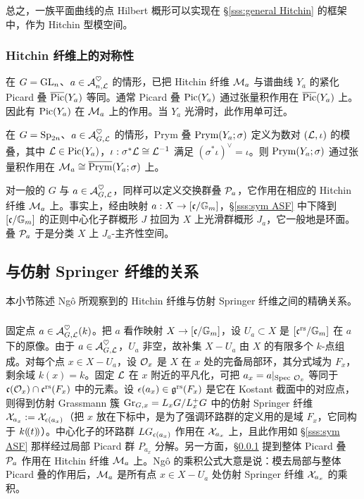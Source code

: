 总之，一族平面曲线的点 Hilbert 概形可以实现在 \S\ref{sss:general Hitchin} 的框架中，作为 Hitchin 型模空间。

\subsubsection{Hitchin 纤维上的对称性}\label{sss:sym Hit}
在 $G=\textup{GL}_{n}$、$a\in\mathcal{A}^{\heartsuit}_{n,\mathcal{L}}$ 的情形，已把 Hitchin 纤维 $\mathcal{M}_{a}$ 与谱曲线 $Y_{a}$ 的紧化 Picard 叠 $\overline{\textup{Pic}}(Y_{a})$ 等同。通常 Picard 叠 $\textup{Pic}(Y_{a})$ 通过张量积作用在 $\overline{\textup{Pic}}(Y_{a})$ 上。因此有 $\textup{Pic}(Y_{a})$ 在 $\mathcal{M}_{a}$ 上的作用。当 $Y_{a}$ 光滑时，此作用单可迁。

在 $G=\textup{Sp}_{2n}$、$a\in\mathcal{A}^{\heartsuit}_{G,\mathcal{L}}$ 的情形，Prym 叠 $\textup{Prym}(Y_{a};\sigma)$ 定义为数对 $(\mathcal{L},\iota)$ 的模叠，其中 $\mathcal{L}\in\textup{Pic}(Y_{a})$，$\iota:\sigma^*\mathcal{L}\cong\mathcal{L}^{-1}$ 满足 $(\sigma^{*}\iota)^{\vee}=\iota$。则 $\textup{Prym}(Y_{a};\sigma)$ 通过张量积作用在 $\mathcal{M}_{a}\cong\overline{\textup{Prym}}(Y_{a};\sigma)$ 上。

对一般的 $G$ 与 $a\in\mathcal{A}^{\heartsuit}_{G,\mathcal{L}}$，同样可以定义交换群叠 $\mathcal{P}_{a}$，它作用在相应的 Hitchin 纤维 $\mathcal{M}_{a}$ 上。事实上，经由映射 $a:X\to [\mathfrak{c}/\mathbb{G}_m]$，\S\ref{sss:sym ASF} 中下降到 $[\mathfrak{c}/\mathbb{G}_m]$ 的正则中心化子群概形 $J$ 拉回为 $X$ 上光滑群概形 $J_{a}$，它一般地是环面。叠 $\mathcal{P}_{a}$ 于是分类 $X$ 上 $J_{a}$-主齐性空间。

\subsection{与仿射 Springer 纤维的关系}\label{ss:rel Hit ASF}
本小节陈述 Ng\^o 所观察到的 Hitchin 纤维与仿射 Springer 纤维之间的精确关系。

\subsubsection{} 固定点 $a\in\mathcal{A}^{\heartsuit}_{G,\mathcal{L}}(k)$。把 $a$ 看作映射 $X\to [\mathfrak{c}/\mathbb{G}_m]$，设 $U_{a}\subset X$ 是 $[\mathfrak{c}^{\textup{rs}}/\mathbb{G}_m]$ 在 $a$ 下的原像。由于 $a\in\mathcal{A}^{\heartsuit}_{G,\mathcal{L}}$，$U_{a}$ 非空，故补集 $X-U_{a}$ 由 $X$ 的有限多个 $k$-点组成。对每个点 $x\in X-U_{a}$，设 $\mathcal{O}_{x}$ 是 $X$ 在 $x$ 处的完备局部环，其分式域为 $F_{x}$，剩余域 $k(x)=k$。固定 $\mathcal{L}$ 在 $x$ 附近的平凡化，可把 $a_{x}=a|_{\textup{Spec}\ \mathcal{O}_{x}}$ 等同于 $\mathfrak{c}(\mathcal{O}_{x})\cap\mathfrak{c}^{\textup{rs}}(F_{x})$ 中的元素。设 $\epsilon(a_{x})\in\mathfrak{g}^{\textup{rs}}(F_{x})$ 是它在 Kostant 截面中的对应点，则得到仿射 Grassmann 簇 $\textup{Gr}_{G, x}=L_{x}G/L^{+}_{x}G$ 中的仿射 Springer 纤维 $\mathcal{X}_{a_{x}}:=\mathcal{X}_{\epsilon(a_{x})}$（把 $x$ 放在下标中，是为了强调环路群的定义用的是域 $F_{x}$，它同构于 $k(\!(t)\!)$）。中心化子的环路群 $LG_{\epsilon(a_{x})}$ 作用在 $\mathcal{X}_{a_{x}}$ 上，且此作用如 \S\ref{sss:sym ASF} 那样经过局部 Picard 群 $P_{a_{x}}$ 分解。另一方面，\S\ref{sss:sym Hit} 提到整体 Picard 叠 $\mathcal{P}_{a}$ 作用在 Hitchin 纤维 $\mathcal{M}_{a}$ 上。Ng\^o 的乘积公式大意是说：模去局部与整体 Picard 叠的作用后，$\mathcal{M}_{a}$ 是所有点 $x\in X-U_{a}$ 处仿射 Springer 纤维 $\mathcal{X}_{a_{x}}$ 的乘积。

